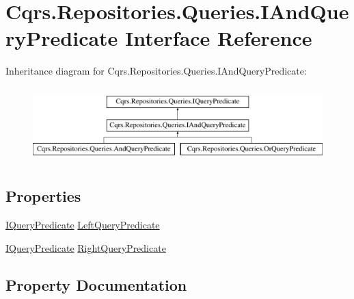 \hypertarget{interfaceCqrs_1_1Repositories_1_1Queries_1_1IAndQueryPredicate}{}\section{Cqrs.\+Repositories.\+Queries.\+I\+And\+Query\+Predicate Interface Reference}
\label{interfaceCqrs_1_1Repositories_1_1Queries_1_1IAndQueryPredicate}
Inheritance diagram for Cqrs.\+Repositories.\+Queries.\+I\+And\+Query\+Predicate\+:\begin{figure}[H]
\begin{center}
\leavevmode
\includegraphics[height=2.916667cm]{interfaceCqrs_1_1Repositories_1_1Queries_1_1IAndQueryPredicate}
\end{center}
\end{figure}
\subsection*{Properties}
\begin{DoxyCompactItemize}
\item 
\hyperlink{interfaceCqrs_1_1Repositories_1_1Queries_1_1IQueryPredicate}{I\+Query\+Predicate} \hyperlink{interfaceCqrs_1_1Repositories_1_1Queries_1_1IAndQueryPredicate_a35166ddeebe86048dba2e7f03407aa94}{Left\+Query\+Predicate}
\item 
\hyperlink{interfaceCqrs_1_1Repositories_1_1Queries_1_1IQueryPredicate}{I\+Query\+Predicate} \hyperlink{interfaceCqrs_1_1Repositories_1_1Queries_1_1IAndQueryPredicate_ab24faa4c3423f91a8d9115b2cae6684b}{Right\+Query\+Predicate}
\end{DoxyCompactItemize}


\subsection{Property Documentation}
\mbox{\label{interfaceCqrs_1_1Repositories_1_1Queries_1_1IAndQueryPredicate_a35166ddeebe86048dba2e7f03407aa94}} 

